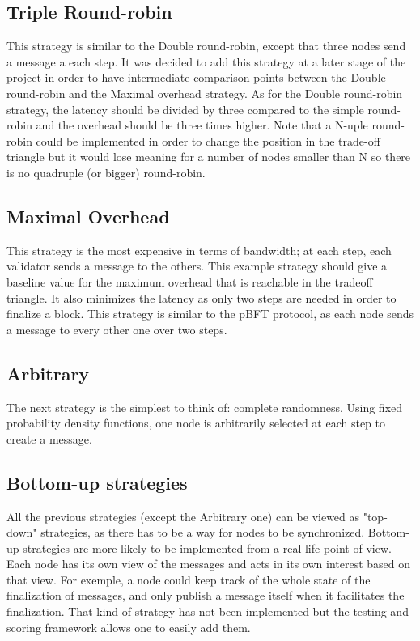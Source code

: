 \subsection{Triple Round-robin}
This strategy is similar to the Double round-robin, except that three nodes send
a message a each step. It was decided to add this strategy at a later stage of
the project in order to have intermediate comparison points between the Double
round-robin and the Maximal overhead strategy. As for the Double round-robin
strategy, the latency should be divided by three compared to the simple
round-robin and the overhead should be three times higher.
Note that a N-uple round-robin could be implemented in order to change the
position in the trade-off triangle but it would lose meaning for a number of
nodes smaller than N so there is no quadruple (or bigger) round-robin.

\subsection{Maximal Overhead}
This strategy is the most expensive in terms of bandwidth; at each step, each
validator sends a message to the others. This example strategy should give a
baseline value for the maximum overhead that is reachable in the tradeoff
triangle. It also minimizes the latency as only two steps are needed in order to
finalize a block. This strategy is similar to the pBFT  protocol, as each
node sends a message to every other one over two steps.

\subsection{Arbitrary}
The next strategy is the simplest to think of: complete randomness. Using fixed
probability density functions, one node is arbitrarily selected at each step to
create a message. 

\subsection{Bottom-up strategies}
\label{ssec:bottomUpStrats}
All the previous strategies (except the Arbitrary one) can be viewed as
"top-down" strategies, as there has to be a way for nodes to be synchronized.
Bottom-up strategies are more likely to be implemented from a real-life point of
view. Each node has its own view of the messages and acts in its own interest
based on that view.
For exemple, a node could keep track of the whole state of the finalization of
messages, and only publish a message itself when it facilitates the
finalization. That kind of strategy has not been implemented but the testing and
scoring framework allows one to easily add them.

